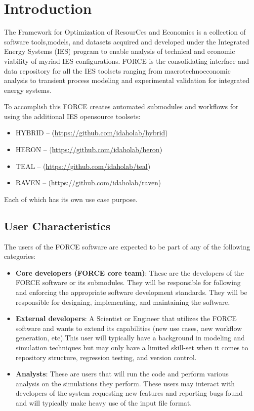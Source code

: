 \section{Introduction}

The Framework for Optimization of ResourCes and Economics is a collection of software tools,models, and datasets acquired and developed under the Integrated Energy Systems (IES) program to enable analysis of technical and economic viability of myriad IES configurations. FORCE is the consolidating interface and data repository for all the IES toolsets ranging from macrotechnoeconomic analysis to transient process modeling and experimental validation for integrated energy systems.

To accomplish this FORCE creates automated submodules and workflows for using the additional IES opensource toolsets:
\begin{itemize}
\item HYBRID -- (\url{https://github.com/idaholab/hybrid})
\item HERON -- (\url{https://github.com/idaholab/heron})
\item TEAL -- (\url{https://github.com/idaholab/teal})
\item RAVEN -- (\url{https://github.com/idaholab/raven})
\end{itemize}

Each of which has its own use case purpose. 



\subsection{User Characteristics}

The users of the FORCE software are expected to be part of any of the following categories:
\begin{itemize}
  \item \textbf{Core developers (FORCE core team)}: These are the developers of the FORCE software or its submodules. They will be responsible for following and enforcing the appropriate software development standards. They will be responsible for designing, implementing, and maintaining the software.
  
  \item \textbf{External developers}: A Scientist or Engineer that utilizes the FORCE software and wants to extend its capabilities (new use cases, new workflow generation, etc).This user will typically have a background in modeling and simulation techniques but may only have a limited skill-set when it comes to repository structure, regression testing, and version control.
  
  \item \textbf{Analysts}:  These are users that will run the code and perform various analysis on the simulations they perform. These users may interact with developers of the system requesting new features and reporting bugs found and will typically make heavy use of the input file format.
\end{itemize}
